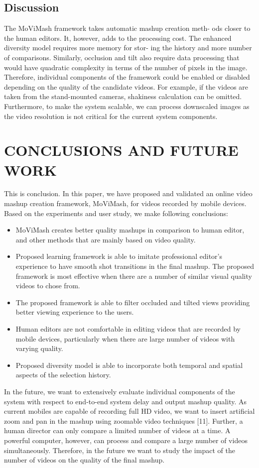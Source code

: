 \documentclass{sig-alternate-05-2015}
\begin{document}
\subsection{Discussion}
The MoViMash framework takes automatic mashup creation meth-
ods closer to the human editors. It, however, adds to the processing cost. The enhanced diversity model requires more memory for stor-
ing the history and more number of comparisons. Similarly, occlusion and tilt also require data processing that would have quadratic
complexity in terms of the number of pixels in the image. Therefore, individual components of the framework could be enabled or
disabled depending on the quality of the candidate videos. For example, if the videos are taken from the stand-mounted cameras,
shakiness calculation can be omitted. Furthermore, to make the
system scalable, we can process downscaled images as the video
resolution is not critical for the current system components.
\section{CONCLUSIONS AND FUTURE WORK}
This is conclusion.
In this paper, we have proposed and validated an online video
mashup creation framework, MoViMash, for videos recorded by
mobile devices. Based on the experiments and user study, we make
following conclusions:
\begin{itemize}
\item MoViMash creates better quality mashups in comparison to
human editor, and other methods that are mainly based on
video quality.
\item Proposed learning framework is able to imitate professional
editor’s experience to have smooth shot transitions in the final mashup. The proposed framework is most effective when there are a number of similar visual quality videos to chose
from.
\item The proposed framework is able to filter occluded and tilted
views providing better viewing experience to the users.
\item Human editors are not comfortable in editing videos that are
recorded by mobile devices, particularly when there are large
number of videos with varying quality.
\item Proposed diversity model is able to incorporate both temporal and spatial aspects of the selection history.
\end{itemize}
In the future, we want to extensively evaluate individual components of the system with respect to end-to-end system delay and
output mashup quality. As current mobiles are capable of recording full HD video, we want to insert artificial zoom and pan in the
mashup using zoomable video techniques [11]. Further, a human
director can only compare a limited number of videos at a time.
A powerful computer, however, can process and compare a large
number of videos simultaneously. Therefore, in the future we want
to study the impact of the number of videos on the quality of the
final mashup.
\end{document}
